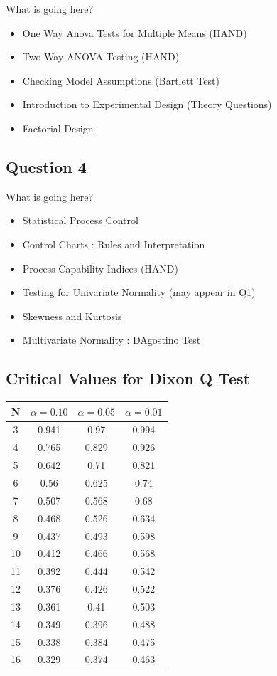 \documentclass[a4paper,12pt]{article}
\begin{document}
\begin{framed}
	What is going here?
\begin{itemize}
\item One Way Anova Tests for Multiple Means (HAND)
\item Two Way ANOVA Testing (HAND)
\item Checking Model Assumptions (Bartlett Test)
\item Introduction to Experimental Design (Theory Questions)
\item Factorial Design
\end{itemize}
\end{framed}


\newpage
\subsection*{Question 4}
\begin{framed}
	What is going here?
\begin{itemize}
\item Statistical Process Control
\item Control Charts : Rules and Interpretation
\item Process Capability Indices (HAND)
\item Testing for Univariate Normality (may appear in Q1)
\item Skewness and Kurtosis
\item Multivariate Normality : DAgostino Test
\end{itemize}
\end{framed}
\newpage
\subsection*{Critical Values for Dixon Q Test}
{
	\Large
	\begin{center}
	\begin{tabular}{|c|c|c|c|}
		\hline  N  & $\alpha=0.10$  & $\alpha=0.05$  & $\alpha=0.01$  \\ \hline
		3  & 0.941 & 0.97  & 0.994 \\ \hline
		4  & 0.765 & 0.829 & 0.926 \\ \hline
		5  & 0.642 & 0.71  & 0.821 \\ \hline
		6  & 0.56  & 0.625 & 0.74  \\ \hline
		7  & 0.507 & 0.568 & 0.68  \\ \hline
		8  & 0.468 & 0.526 & 0.634 \\ \hline
		9  & 0.437 & 0.493 & 0.598 \\ \hline
		10 & 0.412 & 0.466 & 0.568 \\ \hline
		11 & 0.392 & 0.444 & 0.542 \\ \hline
		12 & 0.376 & 0.426 & 0.522 \\ \hline
		13 & 0.361 & 0.41  & 0.503 \\ \hline
		14 & 0.349 & 0.396 & 0.488 \\ \hline
		15 & 0.338 & 0.384 & 0.475 \\ \hline
		16 & 0.329 & 0.374 & 0.463 \\ \hline
	\end{tabular} 
\end{center}
}
\end{document}
